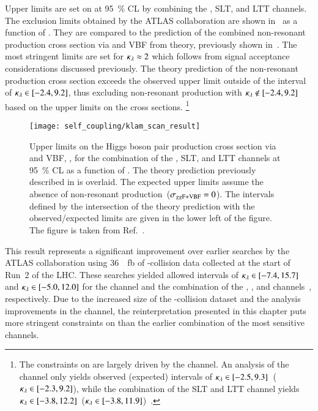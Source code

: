 Upper limits are set on \xsecggfvbf at \SI{95}{\percent} CL by combining the
\hadhad, \lephad SLT, and \lephad LTT channels. The exclusion limits obtained by
the ATLAS collaboration are shown in~ as a function of
\klambda. They are compared to the prediction of the combined non-resonant \HH
production cross section via \ggF and VBF from theory, previously shown
in~. The most stringent limits are set for
$\kappa_{\lambda} \approx 2$ which follows from signal acceptance considerations
discussed previously. The theory prediction of the non-resonant \HH production
cross section exceeds the observed upper limit outside of the interval of
\mbox{$\kappa_{\lambda} \in [-2.4, 9.2]$}, thus excluding non-resonant \HH production
with \mbox{$\kappa_{\lambda} \notin [-2.4, 9.2]$} based on the upper limits on the cross
sections.%
\footnote{The constraints on \klambda are largely driven by the \hadhad
  channel. An analysis of the \hadhad channel only yields observed (expected)
  \klambda intervals of $\kappa_{\lambda} \in [ -2.5, 9.3
  ]$~($\kappa_{\lambda} \in [ -2.3, 9.2 ]$), while the combination of the \lephad SLT
  and LTT channel yields $\kappa_{\lambda} \in [ -3.8, 12.2
  ]$~($\kappa_{\lambda} \in [ -3.8, 11.9 ]$)~\cite{Dimitriadi}.}

\begin{figure}[htbp]
  \centering

  \texttt{[image: self\_coupling/klam\_scan\_result]}

  \caption{Upper limits on the Higgs boson pair production cross
    section via \ggF and VBF, \xsecggfvbf, for the combination of the
    \hadhad, \lephad SLT, and \lephad LTT channels at
    \SI{95}{\percent} CL as a function of \klambda. The theory
    prediction previously described in  is
    overlaid. The expected upper limits assume the absence of
    non-resonant \HH production~($\sigma_{gg\text{F+VBF}} = 0$). The \klambda
    intervals defined by the intersection of the theory prediction
    with the observed/expected limits are given in the lower left of
    the figure. The figure is taken from
    Ref.~\cite{ATLAS-CONF-2021-052}.}%
  \label{fig:klambda_scan}
\end{figure}

This result represents a significant improvement over earlier searches by the
ATLAS collaboration using \SI{36}{\per\femto\barn} of \pp-collision data
collected at the start of Run~2 of the LHC. These searches yielded allowed
\klambda intervals of \mbox{$\kappa_{\lambda} \in [-7.4, 15.7]$} and
\mbox{$\kappa_{\lambda} \in [-5.0, 12.0]$} for the \bbtautau channel and the combination
of the \bbbb, \bbtautau, and \bbyy channels~\cite{HDBS-2018-58},
respectively. Due to the increased size of the \pp-collision dataset and the
analysis improvements in the \bbtautau channel, the reinterpretation presented
in this chapter puts more stringent constraints on \klambda than the earlier
combination of the most sensitive channels.

